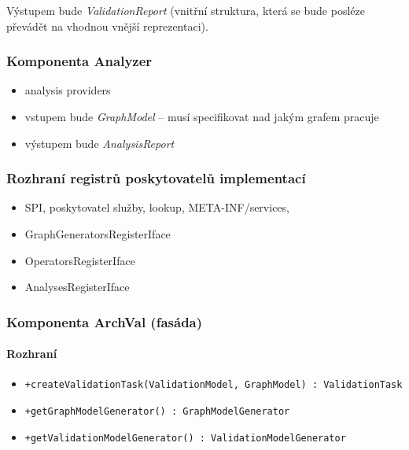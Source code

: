 Výstupem bude \emph{ValidationReport} (vnitřní struktura, která se bude posléze převádět na vhodnou vnější reprezentaci).

\subsubsection{Komponenta Analyzer}
\begin{itemize}
\item analysis providers
\item vstupem bude \emph{GraphModel} -- musí specifikovat nad jakým grafem pracuje
\item výstupem bude \emph{AnalysisReport}
\end{itemize}

\subsubsection{Rozhraní registrů poskytovatelů implementací}
\begin{itemize}
\item SPI, poskytovatel služby, lookup, META-INF/services,
\end{itemize}

\begin{itemize}
\item GraphGeneratorsRegisterIface
\item OperatorsRegisterIface
\item AnalysesRegisterIface
\end{itemize}

\subsubsection{Komponenta ArchVal (fasáda)}
\paragraph{Rozhraní}
\begin{itemize}
\item \verb-+createValidationTask(ValidationModel, GraphModel) : ValidationTask-
\item \verb-+getGraphModelGenerator() : GraphModelGenerator-
\item \verb-+getValidationModelGenerator() : ValidationModelGenerator-
\end{itemize}


